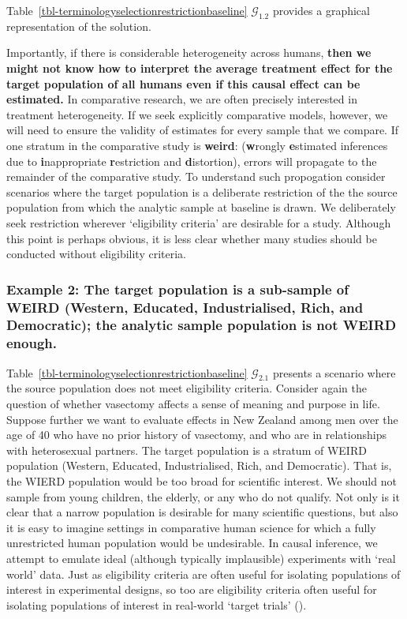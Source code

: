 \documentclass[
  single column]{article}
\begin{document}
Table~\ref{tbl-terminologyselectionrestrictionbaseline}
\(\mathcal{G}_{1.2}\) provides a graphical representation of the
solution.

Importantly, if there is considerable heterogeneity across humans,
\textbf{then we might not know how to interpret the average treatment
effect for the target population of all humans even if this causal
effect can be estimated.} In comparative research, we are often
precisely interested in treatment heterogeneity. If we seek explicitly
comparative models, however, we will need to ensure the validity of
estimates for every sample that we compare. If one stratum in the
comparative study is \textbf{weird}: (\textbf{w}rongly
\textbf{e}stimated inferences due to \textbf{i}nappropriate
\textbf{r}estriction and \textbf{d}istortion), errors will propagate to
the remainder of the comparative study. To understand such propogation
consider scenarios where the target population is a deliberate
restriction of the the source population from which the analytic sample
at baseline is drawn. We deliberately seek restriction wherever
`eligibility criteria' are desirable for a study. Although this point is
perhaps obvious, it is less clear whether many studies should be
conducted without eligibility criteria.

\subsubsection{Example 2: The target population is a sub-sample of WEIRD
(Western, Educated, Industrialised, Rich, and Democratic); the analytic
sample population is not WEIRD
enough.}\label{example-2-the-target-population-is-a-sub-sample-of-weird-western-educated-industrialised-rich-and-democratic-the-analytic-sample-population-is-not-weird-enough.}

Table~\ref{tbl-terminologyselectionrestrictionbaseline}
\(\mathcal{G}_{2.1}\) presents a scenario where the source population
does not meet eligibility criteria. Consider again the question of
whether vasectomy affects a sense of meaning and purpose in life.
Suppose further we want to evaluate effects in New Zealand among men
over the age of 40 who have no prior history of vasectomy, and who are
in relationships with heterosexual partners. The target population is a
stratum of WEIRD population (Western, Educated, Industrialised, Rich,
and Democratic). That is, the WIERD population would be too broad for
scientific interest. We should not sample from young children, the
elderly, or any who do not qualify. Not only is it clear that a narrow
population is desirable for many scientific questions, but also it is
easy to imagine settings in comparative human science for which a fully
unrestricted human population would be undesirable. In causal inference,
we attempt to emulate ideal (although typically implausible) experiments
with `real world' data. Just as eligibility criteria are often useful
for isolating populations of interest in experimental designs, so too
are eligibility criteria often useful for isolating populations of
interest in real-world `target trials'
().
\end{document}
